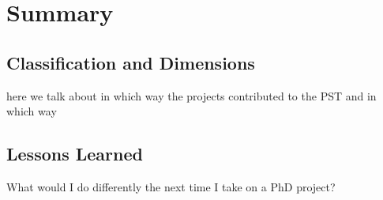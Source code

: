 \chapter[Summary]{Summary}\label{chap:summary}



\section{Classification and Dimensions}
here we talk about in which way the projects contributed to the PST and in which way


\section{Lessons Learned}
What would I do differently the next time I take on a PhD project?



